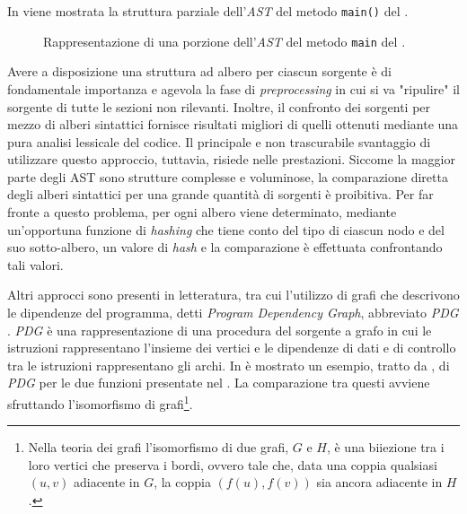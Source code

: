 In  viene mostrata la struttura parziale dell'\textit{AST} del metodo \texttt{main()} del .

\begin{figure}
    \caption{Rappresentazione di una porzione dell'\textit{AST} del metodo \texttt{main} del .}
    \label{img:01-ast}
\end{figure}

Avere a disposizione una struttura ad albero per ciascun sorgente è di fondamentale importanza e agevola la fase di \textit{preprocessing} in cui si va "ripulire" il sorgente di tutte le sezioni non rilevanti.
%
Inoltre, il confronto dei sorgenti per mezzo di alberi sintattici fornisce risultati migliori di quelli ottenuti mediante una pura analisi lessicale del codice.
%
Il principale e non trascurabile svantaggio di utilizzare questo approccio, tuttavia, risiede nelle prestazioni.
%
Siccome la maggior parte degli AST sono strutture complesse e voluminose, la comparazione diretta degli alberi sintattici per una grande quantità di sorgenti è proibitiva.
%
Per far fronte a questo problema, per ogni albero viene determinato, mediante un'opportuna funzione di \textit{hashing} che tiene conto del tipo di ciascun nodo e del suo sotto-albero, un valore di \textit{hash} e la comparazione è effettuata confrontando tali valori.

Altri approcci sono presenti in letteratura, tra cui l'utilizzo di grafi che descrivono le dipendenze del programma, detti \textit{Program Dependency Graph}, abbreviato \textit{PDG} \cite{gplag}.
%
\textit{PDG} è una rappresentazione di una procedura del sorgente a grafo in cui le istruzioni rappresentano l'insieme dei vertici e le dipendenze di dati e di controllo tra le istruzioni rappresentano gli archi.
%
In  è mostrato un esempio, tratto da \cite{gplag}, di \textit{PDG} per le due funzioni presentate nel .
%
La comparazione tra questi avviene sfruttando l'isomorfismo di grafi\footnote{Nella teoria dei grafi l'isomorfismo di due grafi, $G$ e $H$, è una biiezione tra i loro vertici che preserva i bordi, ovvero tale che, data una coppia qualsiasi $(u, v)$ adiacente in $G$, la coppia $(f(u), f(v))$ sia ancora adiacente in $H$.}.

